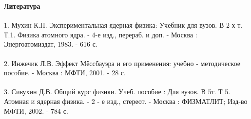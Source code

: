 \documentclass{article}
\begin{document}
\pagebreak
\Huge\textbf{Литература}
\\
\\
\indent\large 1. Мухин К.Н. Экспериментальная ядерная физика: Учебник для вузов. В 2-х т. Т.1. Физика атомного ядра. - 4-е изд., перераб. и доп. - Москва : Энергоатомиздат, 1983. - 616 с.
\\
\\
\indent\large 2. Инжечик Л.В. Эффект Мёссбауэра и его применения: учебно - методическое пособие. - Москва : МФТИ, 2001. - 28 с.
\\
\\
\indent\large 3. Сивухин Д.В. Общий курс физики. Учеб. пособие : Для вузов. В 5т. Т 5. Атомная и ядерная физика. - 2 - е изд., стереот. - Москва : ФИЗМАТЛИТ; Изд-во МФТИ, 2002. - 784 с.
\end{document}
